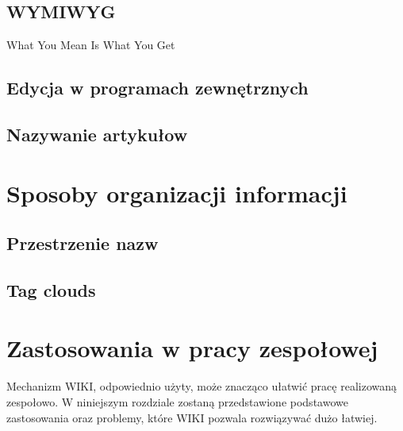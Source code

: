 \documentclass{article}
\begin{document}
	\subsection{WYMIWYG}
What You Mean Is What You Get

	\subsection{Edycja w programach zewnętrznych}


	\subsection{Nazywanie artykułow}

\newpage
\section{Sposoby organizacji informacji}	
	\subsection{Przestrzenie nazw}
	\subsection{Tag clouds}


	

\newpage
\section{Zastosowania w pracy zespołowej}
Mechanizm WIKI, odpowiednio użyty, może znacząco ułatwić pracę realizowaną zespołowo. W niniejszym rozdziale zostaną przedstawione podstawowe zastosowania oraz problemy, które WIKI pozwala rozwiązywać dużo łatwiej. 
\end{document}

